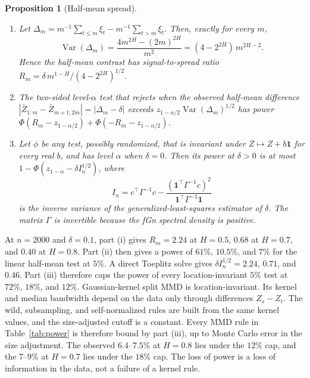 \documentclass[11pt]{article}
\newtheorem{proposition}{Proposition}
\theoremstyle{remark}
\newcommand{\one}{\mathbf 1}
\newcommand{\Var}{\operatorname{Var}}
\begin{document}
\begin{proposition}[Half-mean spread]\label{prop:halfmean}
\begin{enumerate}[label=(\roman*),nosep]
\item Let $\Delta_m=m^{-1}\sum_{t\le m}\xi_t-m^{-1}\sum_{t>m}\xi_t$. Then, exactly for every $m$,
\begin{equation}\label{eq:halfvar}
\Var(\Delta_m)=\frac{4m^{2H}-(2m)^{2H}}{m^2}=(4-2^{2H})\,m^{2H-2}.
\end{equation}
Hence the half-mean contrast has signal-to-spread ratio $R_m=\delta\,m^{1-H}/(4-2^{2H})^{1/2}$.
\item The two-sided level-$\alpha$ test that rejects when the observed half-mean difference $|\bar Z_{1:m}-\bar Z_{m+1:2m}|=|\Delta_m-\delta|$ exceeds $z_{1-\alpha/2}\Var(\Delta_m)^{1/2}$ has power $\Phi(R_m-z_{1-\alpha/2})+\Phi(-R_m-z_{1-\alpha/2})$.
\item Let $\phi$ be any test, possibly randomized, that is invariant under $Z\mapsto Z+b\one$ for every real $b$, and has level $\alpha$ when $\delta=0$. Then its power at $\delta>0$ is at most $1-\Phi(z_{1-\alpha}-\delta I_n^{1/2})$, where
\begin{equation}\label{eq:info}
I_n=c^\top\Gamma^{-1}c-\frac{(\one^\top\Gamma^{-1}c)^2}{\one^\top\Gamma^{-1}\one}
\end{equation}
is the inverse variance of the generalized-least-squares estimator of $\delta$. The matrix $\Gamma$ is invertible because the fGn spectral density is positive.
\end{enumerate}
\end{proposition}

At $n=2000$ and $\delta=0.1$, part (i) gives $R_m=2.24$ at $H=0.5$, $0.68$ at $H=0.7$, and $0.40$ at $H=0.8$. Part (ii) then gives a power of $61\%$, $10.5\%$, and $7\%$ for the linear half-mean test at $5\%$. A direct Toeplitz solve gives $\delta I_n^{1/2}=2.24$, $0.71$, and $0.46$. Part (iii) therefore caps the power of every location-invariant $5\%$ test at $72\%$, $18\%$, and $12\%$. Gaussian-kernel split MMD is location-invariant. Its kernel and median bandwidth depend on the data only through differences $Z_s-Z_t$. The wild, subsampling, and self-normalized rules are built from the same kernel values, and the size-adjusted cutoff is a constant. Every MMD rule in Table~\ref{tab:power} is therefore bound by part (iii), up to Monte Carlo error in the size adjustment. The observed $6.4$--$7.5\%$ at $H=0.8$ lies under the $12\%$ cap, and the $7$--$9\%$ at $H=0.7$ lies under the $18\%$ cap. The loss of power is a loss of information in the data, not a failure of a kernel rule.
\end{document}
